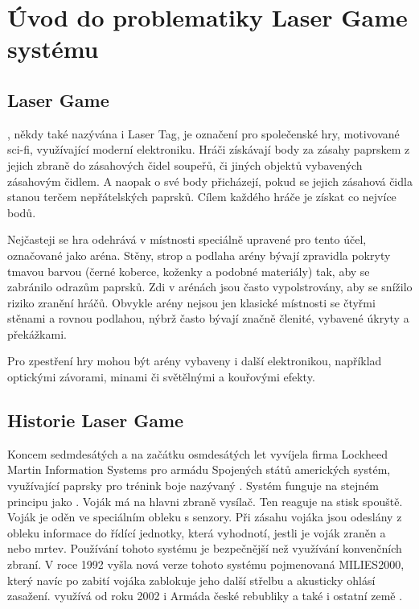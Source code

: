 \section{Úvod do problematiky Laser Game systému}

\subsection{Laser Game}
, někdy také nazývána i Laser Tag, je označení pro společenské hry, motivované sci-fi, využívající moderní elektroniku. Hráči získávají body za zásahy  paprskem z jejich zbraně do zásahových čidel soupeřů, či jiných objektů vybavených zásahovým čidlem. A naopak o své body přicházejí, pokud se jejich zásahová čidla stanou terčem nepřátelských  paprsků. Cílem každého hráče je získat co nejvíce bodů.

Nejčasteji se hra odehrává v místnosti speciálně upravené pro tento účel, označované jako aréna. Stěny, strop a podlaha arény bývají zpravidla pokryty tmavou barvou (černé koberce, koženky a podobné materiály) tak, aby se zabránilo odrazům  paprsků. Zdi v arénách jsou často vypolstrovány, aby se snížilo riziko zranění hráčů. Obvykle arény nejsou jen klasické místnosti se čtyřmi stěnami a rovnou podlahou, nýbrž často bývají značně členité, vybavené úkryty a překážkami.

Pro zpestření hry mohou být arény vybaveny i další elektronikou, například optickými závorami, minami či světělnými a kouřovými efekty.



\subsection{Historie Laser Game}
Koncem sedmdesátých a na začátku osmdesátých let vyvíjela firma Lockheed Martin Information Systems pro armádu Spojených států amerických systém, využívající  paprsky pro trénink boje nazývaný . Systém funguje na stejném principu jako . Voják má na hlavni zbraně  vysílač. Ten reaguje na stisk spouště. Voják je oděn ve speciálním obleku s  senzory. Při zásahu vojáka jsou odeslány z obleku informace do řídící jednotky, která vyhodnotí, jestli je voják zraněn a nebo mrtev. Používání tohoto systému je bezpečnější než využívání konvenčních zbraní. V roce 1992 vyšla nová verze tohoto systému pojmenovaná MILIES2000, který navíc po zabití vojáka zablokuje jeho další střelbu a akusticky ohlásí zasažení.  využívá od roku 2002 i Armáda české rebubliky a také i ostatní země .

